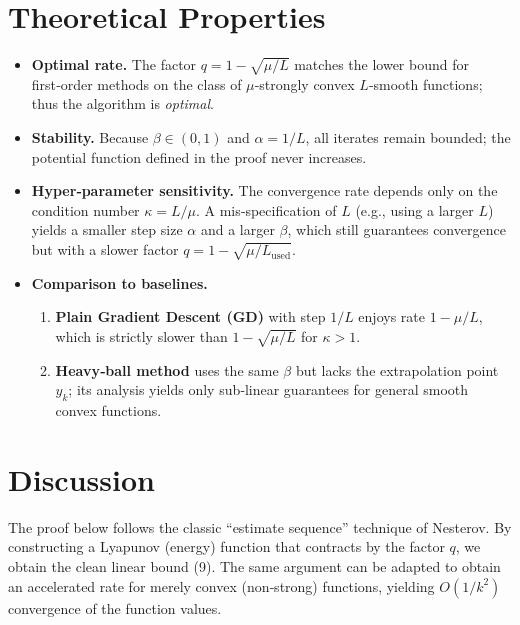 \documentclass{article}
\begin{document}
\section*{Theoretical Properties}
\begin{itemize}[leftmargin=*]
\item \textbf{Optimal rate.} The factor $q=1-\sqrt{\mu/L}$ matches the lower bound for first‑order methods on the class of $\mu$‑strongly convex $L$‑smooth functions; thus the algorithm is \emph{optimal}.
\item \textbf{Stability.} Because $\beta\in(0,1)$ and $\alpha=1/L$, all iterates remain bounded; the potential function defined in the proof never increases.
\item \textbf{Hyper‑parameter sensitivity.} The convergence rate depends only on the condition number $\kappa=L/\mu$.  A mis‑specification of $L$ (e.g., using a larger $L$) yields a smaller step size $\alpha$ and a larger $\beta$, which still guarantees convergence but with a slower factor $q=1-\sqrt{\mu/L_{\text{used}}}$.
\item \textbf{Comparison to baselines.}
    \begin{enumerate}
        \item \textbf{Plain Gradient Descent (GD)} with step $1/L$ enjoys rate $1-\mu/L$, which is strictly slower than $1-\sqrt{\mu/L}$ for $\kappa>1$.
        \item \textbf{Heavy‑ball method} uses the same $\beta$ but lacks the extrapolation point $y_{k}$; its analysis yields only sub‑linear guarantees for general smooth convex functions.
    \end{enumerate}
\end{itemize}
\section*{Discussion}
The proof below follows the classic ``estimate sequence'' technique of Nesterov.  By constructing a Lyapunov (energy) function that contracts by the factor $q$, we obtain the clean linear bound (9).  The same argument can be adapted to obtain an accelerated rate for merely convex (non‑strong) functions, yielding $O(1/k^{2})$ convergence of the function values.
\end{document}

